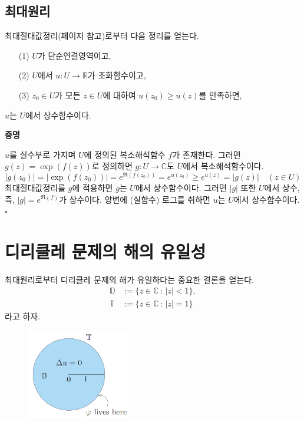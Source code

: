 \subsection{최대원리}

최대절대값정리(\pageref{sec-4-6}페이지 참고)로부터 %
다음 정리를 얻는다.

\begin{salttheorem} [최대원리] {}{} \label{thm-5-4}

\begin{itemize}
\item[(1)] $U$가 단순연결영역이고,
\item[(2)] $U$에서 $u:U\to\mathbb R$가 조화함수이고,
\item[(3)] $z_0\in U$가 모든 $z\in U$에 대하여 $u(z_0) \ge u(z)$를 만족하면,
\end{itemize}
$u$는 $U$에서 상수함수이다.
\end{salttheorem}

{\bf 증명}

$u$를 실수부로 가지며 $U$에 정의된 복소해석함수 $f$가 존재한다.
그러면 $g(z)=\exp(f(z))$로 정의하면
$g:U\to\mathbb C$도 $U$에서 복소해석함수이다.
\[
|g(z_0)| = |\exp(f(z_0))| = e^{\Re(f(z_0))}
= e^{u(z_0)} \ge e^{u(z)} = |g(z)|
\quad (z\in U)
\]
최대절대값정리를 $g$에 적용하면
$g$는 $U$에서 상수함수이다.
그러면 $|g|$ 또한 $U$에서 상수, 즉, $|g| = e^{\Re(f)}$가 상수이다.
양변에 (실함수) 로그를 취하면 $u$는  $U$에서 상수함수이다.
\hfill $\square$

\section{디리클레 문제의 해의 유일성}

최대원리로부터 디리클레 문제의 해가 유일하다는 중요한 결론을 얻는다.
\begin{align*}
\mathbb D&:= \{ z\in\mathbb C\,:\, |z|<1\},\\
\mathbb T&:= \{ z\in\mathbb C\,:\, |z|=1\}
\end{align*}
라고 하자.

\begin{figure}[h!]
\begin{center}
\includegraphics[width=0.4\textwidth]{./SaltChapter/fig-5-0-2}
\end{center}
\end{figure}

